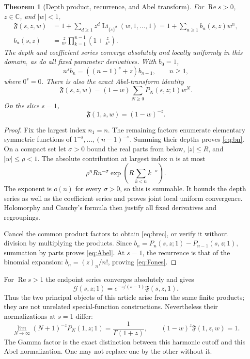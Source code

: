 \documentclass[11pt]{article}
\numberwithin{equation}{section}
\newtheorem{theorem}{Theorem}[section]
\theoremstyle{definition}\newtheorem{definition}[theorem]{Definition}
\theoremstyle{remark}\newtheorem{remark}[theorem]{Remark}
\DeclareMathOperator{\Li}{Li}
\DeclareMathOperator{\Rea}{Re}
\newcommand{\C}{\mathbb C}\newcommand{\Q}{\mathbb Q}
\newcommand{\G}{\mathcal G}\newcommand{\F}{\mathfrak F}
\begin{document}
\begin{theorem}[Depth product, recurrence, and Abel transform]
\label{thm:polygen}
For $\Rea s>0$, $z\in\C$, and $|w|<1$,
\begin{align}
 \F(s,z,w)&=1+\sum_{d\ge1}z^d\Li_{\{s\}^d}(w,1,\ldots,1)
            =1+\sum_{n\ge1}b_n(s,z)w^n,\label{eq:Fdef}\\
 b_n(s,z)&=\frac z{n^s}\prod_{k=1}^{n-1}\left(1+\frac z{k^s}\right).
 \label{eq:bn}
\end{align}
The depth and coefficient series converge absolutely and locally uniformly
in this domain, as do all fixed parameter derivatives. With $b_0=1$,
\begin{equation}
 n^s b_n=((n-1)^s+z)b_{n-1},\qquad n\ge1,
 \label{eq:brec}
\end{equation}
where $0^s=0$. There is also the exact Abel-transform identity
\begin{equation}
 \F(s,z,w)=(1-w)\sum_{N\ge0}P_N(s,z;1)w^N.
 \label{eq:Abel}
\end{equation}
On the slice $s=1$,
\begin{equation}
 \F(1,z,w)=(1-w)^{-z}.
 \label{eq:Fones}
\end{equation}
\end{theorem}
\begin{proof}
Fix the largest index $n_1=n$. The remaining factors enumerate elementary
symmetric functions of $1^{-s},\ldots,(n-1)^{-s}$. Summing their depths
proves \eqref{eq:bn}. On a compact set let $\sigma>0$ bound the real parts
from below, $|z|\le R$, and $|w|\le\rho<1$. The absolute contribution
at largest index $n$ is at most
\[
 \rho^n Rn^{-\sigma}\exp\left(R\sum_{k<n}k^{-\sigma}\right).
\]
The exponent is $o(n)$ for every $\sigma>0$, so this is summable.
It bounds the depth series as well as the coefficient series and proves
joint local uniform convergence. Holomorphy and Cauchy's formula then
justify all fixed derivatives and regroupings.

Cancel the common product factors to obtain \eqref{eq:brec}, or verify it
without division by multiplying the products. Since
$b_n=P_n(s,z;1)-P_{n-1}(s,z;1)$, summation by parts proves
\eqref{eq:Abel}. At $s=1$, the recurrence is that of the binomial expansion:
$b_n=(z)_n/n!$, proving \eqref{eq:Fones}.
\end{proof}

For $\Rea s>1$ the endpoint series converges absolutely and gives
\begin{equation}
 \G(s,z;1)=e^{-z/(s-1)}\F(s,z,1).
 \label{eq:FtoG}
\end{equation}
Thus the two principal objects of this article arise from the same finite
products; they are not unrelated special-function constructions.
Nevertheless their normalizations at $s=1$ differ:
\begin{equation}
 \lim_{N\to\infty}(N+1)^{-z}P_N(1,z;1)=\frac1{\Gamma(1+z)},
 \qquad (1-w)^z\F(1,z,w)=1.
 \label{eq:AbelGamma}
\end{equation}
The Gamma factor is the exact distinction between this harmonic cutoff and
this Abel normalization. One may not replace one by the other without it.
\end{document}
